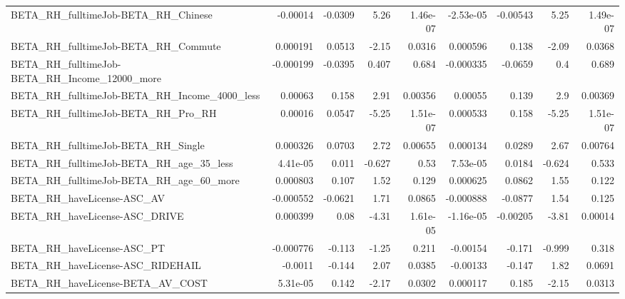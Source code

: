 \begin{tabular}{lrrrrrrrr}
BETA\_RH\_fulltimeJob-BETA\_RH\_Chinese                &    -0.00014 &      -0.0309 &      5.26 & 1.46e-07 &  -2.53e-05 &    -0.00543 &         5.25 &      1.49e-07 \\
BETA\_RH\_fulltimeJob-BETA\_RH\_Commute                &    0.000191 &       0.0513 &     -2.15 &   0.0316 &   0.000596 &       0.138 &        -2.09 &        0.0368 \\
BETA\_RH\_fulltimeJob-BETA\_RH\_Income\_12000\_more      &   -0.000199 &      -0.0395 &     0.407 &    0.684 &  -0.000335 &     -0.0659 &          0.4 &         0.689 \\
BETA\_RH\_fulltimeJob-BETA\_RH\_Income\_4000\_less       &     0.00063 &        0.158 &      2.91 &  0.00356 &    0.00055 &       0.139 &          2.9 &       0.00369 \\
BETA\_RH\_fulltimeJob-BETA\_RH\_Pro\_RH                 &     0.00016 &       0.0547 &     -5.25 & 1.51e-07 &   0.000533 &       0.158 &        -5.25 &      1.51e-07 \\
BETA\_RH\_fulltimeJob-BETA\_RH\_Single                 &    0.000326 &       0.0703 &      2.72 &  0.00655 &   0.000134 &      0.0289 &         2.67 &       0.00764 \\
BETA\_RH\_fulltimeJob-BETA\_RH\_age\_35\_less            &    4.41e-05 &        0.011 &    -0.627 &     0.53 &   7.53e-05 &      0.0184 &       -0.624 &         0.533 \\
BETA\_RH\_fulltimeJob-BETA\_RH\_age\_60\_more            &    0.000803 &        0.107 &      1.52 &    0.129 &   0.000625 &      0.0862 &         1.55 &         0.122 \\
BETA\_RH\_haveLicense-ASC\_AV                         &   -0.000552 &      -0.0621 &      1.71 &   0.0865 &  -0.000888 &     -0.0877 &         1.54 &         0.125 \\
BETA\_RH\_haveLicense-ASC\_DRIVE                      &    0.000399 &         0.08 &     -4.31 & 1.61e-05 &  -1.16e-05 &    -0.00205 &        -3.81 &       0.00014 \\
BETA\_RH\_haveLicense-ASC\_PT                         &   -0.000776 &       -0.113 &     -1.25 &    0.211 &   -0.00154 &      -0.171 &       -0.999 &         0.318 \\
BETA\_RH\_haveLicense-ASC\_RIDEHAIL                   &     -0.0011 &       -0.144 &      2.07 &   0.0385 &   -0.00133 &      -0.147 &         1.82 &        0.0691 \\
BETA\_RH\_haveLicense-BETA\_AV\_COST                   &    5.31e-05 &        0.142 &     -2.17 &   0.0302 &   0.000117 &       0.185 &        -2.15 &        0.0313 \\

\end{tabular}
